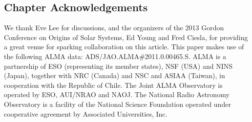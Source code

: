 \subsection{Chapter Acknowledgements}
We thank Eve Lee for discussions, and the organizers of the 2013 
Gordon Conference on Origins of Solar Systems, Ed Young and Fred Ciesla, for 
providing a great venue for sparking collaboration on this article.  This paper 
makes use of the following ALMA data: ADS/JAO.ALMA\#2011.0.00465.S.  ALMA is a 
partnership of ESO (representing its member states), NSF (USA) and NINS 
(Japan), together with NRC (Canada) and NSC and ASIAA (Taiwan), in cooperation 
with the Republic of Chile.  The Joint ALMA Observatory is operated by ESO, 
AUI/NRAO and NAOJ.  The National Radio Astronomy Observatory is a facility of 
the National Science Foundation operated under cooperative agreement by 
Associated Universities, Inc.

\clearpage

%
